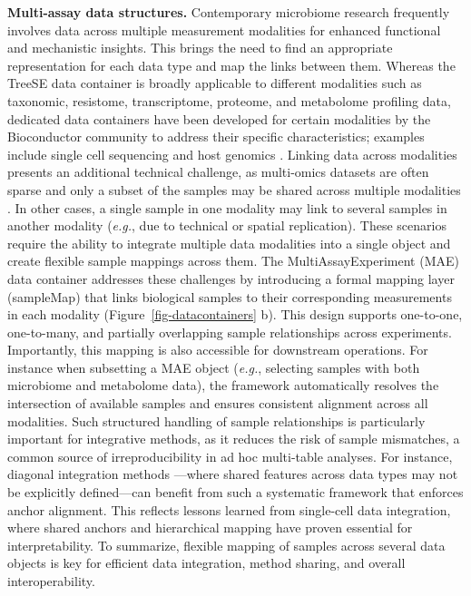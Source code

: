 \documentclass[
  sn-nature,
]{sn-jnl}
\begin{document}
\textbf{Multi-assay data structures.} Contemporary microbiome research
frequently involves data across multiple measurement modalities for
enhanced functional and mechanistic insights. This brings the need to
find an appropriate representation for each data type and map the links
between them. Whereas the TreeSE data container is broadly applicable to
different modalities such as taxonomic, resistome, transcriptome,
proteome, and metabolome profiling data, dedicated data containers have
been developed for certain modalities by the Bioconductor community to
address their specific characteristics; examples include single cell
sequencing \citep{amezquita2020} and host genomics \citep{lawrence2013}.
Linking data across modalities presents an additional technical
challenge, as multi-omics datasets are often sparse and only a subset of
the samples may be shared across multiple modalities
\citep{sherwani2025}. In other cases, a single sample in one modality
may link to several samples in another modality \citep{husso2023}
(\emph{e.g.}, due to technical or spatial replication). These scenarios
require the ability to integrate multiple data modalities into a single
object and create flexible sample mappings across them. The
MultiAssayExperiment (MAE) data container \citep{ramos2017} addresses
these challenges by introducing a formal mapping layer (sampleMap) that
links biological samples to their corresponding measurements in each
modality (Figure~\ref{fig-datacontainers} b). This design supports
one-to-one, one-to-many, and partially overlapping sample relationships
across experiments. Importantly, this mapping is also accessible for
downstream operations. For instance when subsetting a MAE object
(\emph{e.g.}, selecting samples with both microbiome and metabolome
data), the framework automatically resolves the intersection of
available samples and ensures consistent alignment across all
modalities. Such structured handling of sample relationships is
particularly important for integrative methods, as it reduces the risk
of sample mismatches, a common source of irreproducibility in ad hoc
multi-table analyses. For instance, diagonal integration methods
\citep{xu2022, argelaguet2021computational}---where shared features
across data types may not be explicitly defined---can benefit from such
a systematic framework that enforces anchor alignment. This reflects
lessons learned from single-cell data integration, where shared anchors
and hierarchical mapping have proven essential for interpretability. To
summarize, flexible mapping of samples across several data objects is
key for efficient data integration, method sharing, and overall
interoperability.
\end{document}
